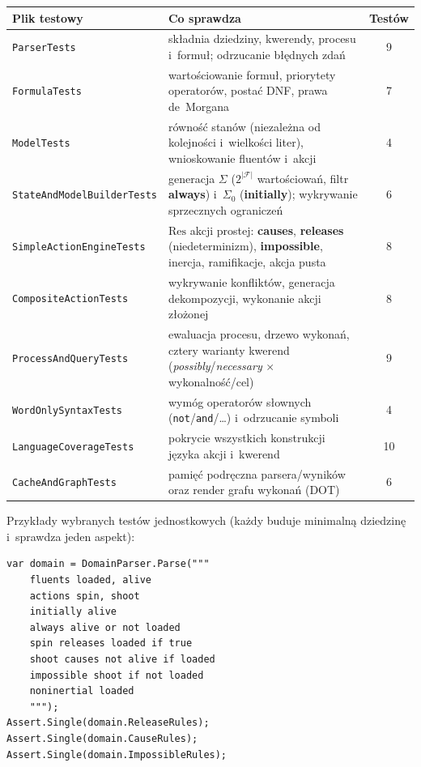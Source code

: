 \documentclass[11pt,a4paper]{article}
\newcommand{\Res}{\mathrm{Res}}
\begin{document}
\begin{center}
\small
\begin{tabular}{@{}p{4.4cm}p{8.4cm}c@{}}
\toprule
\textbf{Plik testowy} & \textbf{Co sprawdza} & \textbf{Testów} \\
\midrule
\texttt{ParserTests} &
  składnia dziedziny, kwerendy, procesu i~formuł; odrzucanie błędnych
  zdań & 9 \\
\texttt{FormulaTests} &
  wartościowanie formuł, priorytety operatorów, postać DNF, prawa
  de~Morgana & 7 \\
\texttt{ModelTests} &
  równość stanów (niezależna od kolejności i~wielkości liter),
  wnioskowanie fluentów i~akcji & 4 \\
\texttt{StateAndModelBuilderTests} &
  generacja $\Sigma$ ($2^{|\mathcal{F}|}$ wartościowań, filtr
  \textbf{always}) i~$\Sigma_0$ (\textbf{initially}); wykrywanie
  sprzecznych ograniczeń & 6 \\
\texttt{SimpleActionEngineTests} &
  $\Res$ akcji prostej: \textbf{causes}, \textbf{releases}
  (niedeterminizm), \textbf{impossible}, inercja, ramifikacje, akcja
  pusta & 8 \\
\texttt{CompositeActionTests} &
  wykrywanie konfliktów, generacja dekompozycji, wykonanie akcji
  złożonej & 8 \\
\texttt{ProcessAndQueryTests} &
  ewaluacja procesu, drzewo wykonań, cztery warianty kwerend
  (\emph{possibly}/\emph{necessary} $\times$ wykonalność/cel) & 9 \\
\texttt{WordOnlySyntaxTests} &
  wymóg operatorów słownych (\texttt{not}/\texttt{and}/\dots) i~odrzucanie
  symboli & 4 \\
\texttt{LanguageCoverageTests} &
  pokrycie wszystkich konstrukcji języka akcji i~kwerend & 10 \\
\texttt{CacheAndGraphTests} &
  pamięć podręczna parsera/wyników oraz render grafu wykonań (DOT) & 6 \\
\bottomrule
\end{tabular}
\end{center}

Przykłady wybranych testów jednostkowych (każdy buduje minimalną dziedzinę
i~sprawdza jeden aspekt):

\begin{lstlisting}[style=ds4code, caption={Parser dziedziny --- rozpoznanie wszystkich typów zdań}]
var domain = DomainParser.Parse("""
    fluents loaded, alive
    actions spin, shoot
    initially alive
    always alive or not loaded
    spin releases loaded if true
    shoot causes not alive if loaded
    impossible shoot if not loaded
    noninertial loaded
    """);
Assert.Single(domain.ReleaseRules);
Assert.Single(domain.CauseRules);
Assert.Single(domain.ImpossibleRules);
\end{lstlisting}
\end{document}
